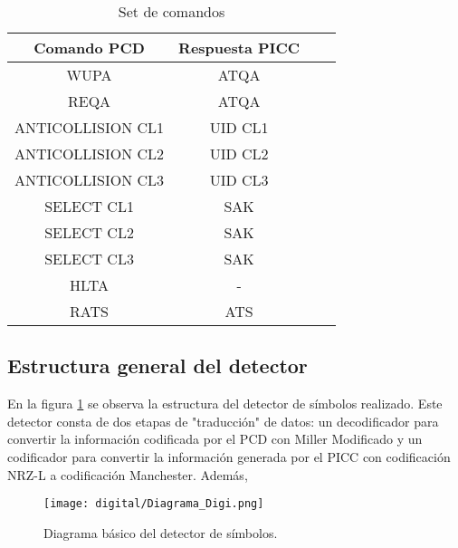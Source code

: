 \begin{table}[H]
\centering
\begin{tabular}{c|c|c|c}
\textbf{Comando PCD} & \textbf{Respuesta PICC}                                                   \\ \hline
WUPA                    & ATQA                                                                        \\
REQA                 	& ATQA                                                                         \\
ANTICOLLISION CL1                  & UID CL1                                                                             \\
ANTICOLLISION CL2                  & UID CL2                                                                            \\
ANTICOLLISION CL3                 & UID CL3                                                                             \\
SELECT CL1                  & SAK                                                                            \\
SELECT CL2                  & SAK                                                                          \\
SELECT CL3                  & SAK                                                                                 \\
HLTA                  & -                                                                           \\
RATS                  & ATS       
\end{tabular}
\caption{Set de comandos}
\label{table:set_com}
\end{table}

\subsection{Estructura general del detector}
En la figura \ref{fig:dig_diag} se observa la estructura del detector de símbolos realizado.
Este detector consta de dos etapas de "traducción" de datos: un decodificador para convertir la información codificada por el PCD con Miller Modificado y un codificador para convertir la información generada por el PICC con codificación NRZ-L a codificación Manchester. Además, 

\begin{figure}[H]
\centering
\texttt{[image: digital/Diagrama\_Digi.png]}
\caption{Diagrama básico del detector de símbolos.}
\label{fig:dig_diag}
\end{figure}

